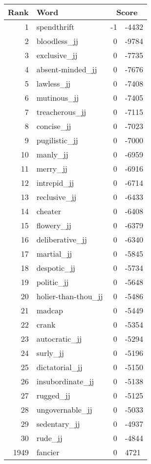 \begin{longtable}[!htbp]{| rlr@{.}l |}
    \hline
    \textbf{Rank} & \textbf{Word} & \multicolumn{2}{c|}{\textbf{Score}} \\
    \hline
    \endhead
    1 & spendthrift & -1 & -4432 \\
    2 & bloodless\_jj & 0 & -9784 \\
    3 & exclusive\_jj & 0 & -7735 \\
    4 & absent-minded\_jj & 0 & -7676 \\
    5 & lawless\_jj & 0 & -7408 \\
    6 & mutinous\_jj & 0 & -7405 \\
    7 & treacherous\_jj & 0 & -7115 \\
    8 & concise\_jj & 0 & -7023 \\
    9 & pugilistic\_jj & 0 & -7000 \\
    10 & manly\_jj & 0 & -6959 \\
    11 & merry\_jj & 0 & -6916 \\
    12 & intrepid\_jj & 0 & -6714 \\
    13 & reclusive\_jj & 0 & -6433 \\
    14 & cheater & 0 & -6408 \\
    15 & flowery\_jj & 0 & -6379 \\
    16 & deliberative\_jj & 0 & -6340 \\
    17 & martial\_jj & 0 & -5845 \\
    18 & despotic\_jj & 0 & -5734 \\
    19 & politic\_jj & 0 & -5648 \\
    20 & holier-than-thou\_jj & 0 & -5486 \\
    21 & madcap & 0 & -5449 \\
    22 & crank & 0 & -5354 \\
    23 & autocratic\_jj & 0 & -5294 \\
    24 & surly\_jj & 0 & -5196 \\
    25 & dictatorial\_jj & 0 & -5150 \\
    26 & insubordinate\_jj & 0 & -5138 \\
    27 & rugged\_jj & 0 & -5125 \\
    28 & ungovernable\_jj & 0 & -5033 \\
    29 & sedentary\_jj & 0 & -4937 \\
    30 & rude\_jj & 0 & -4844 \\
    1949 & fancier & 0 & 4721 \\

\end{longtable}
